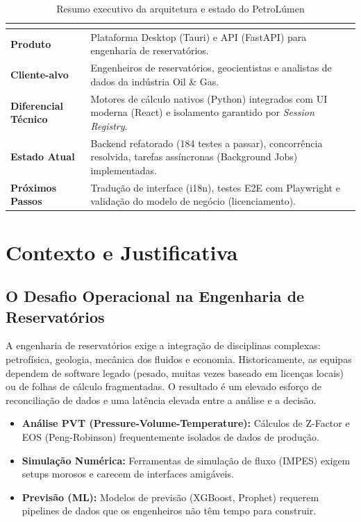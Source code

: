 \documentclass[12pt,a4paper]{article}
\begin{document}
\begin{table}[H]
\centering\small
\begin{tabularx}{\textwidth}{>{\bfseries}p{3.4cm} X}
\toprule
\rowcolor{tableheader}\multicolumn{2}{c}{\textcolor{white}{\textbf{Resumo da Proposta de Valor PetroLúmen}}}\\
\midrule
Produto & Plataforma Desktop (Tauri) e API (FastAPI) para engenharia de reservatórios.\\
Cliente-alvo & Engenheiros de reservatórios, geocientistas e analistas de dados da indústria Oil \& Gas.\\
Diferencial Técnico & Motores de cálculo nativos (Python) integrados com UI moderna (React) e isolamento garantido por \textit{Session Registry}.\\
Estado Atual & Backend refatorado (184 testes a passar), concorrência resolvida, tarefas assíncronas (Background Jobs) implementadas.\\
Próximos Passos & Tradução de interface (i18n), testes E2E com Playwright e validação do modelo de negócio (licenciamento).\\
\bottomrule
\end{tabularx}
\caption{Resumo executivo da arquitetura e estado do PetroLúmen}
\end{table}

\newpage

\section{Contexto e Justificativa}

\subsection{O Desafio Operacional na Engenharia de Reservatórios}

A engenharia de reservatórios exige a integração de disciplinas complexas: petrofísica, geologia, mecânica dos fluidos e economia. Historicamente, as equipas dependem de software legado (pesado, muitas vezes baseado em licenças locais) ou de folhas de cálculo fragmentadas. O resultado é um elevado esforço de reconciliação de dados e uma latência elevada entre a análise e a decisão.

\begin{itemize}[leftmargin=*]
    \item \textbf{Análise PVT (Pressure-Volume-Temperature):} Cálculos de Z-Factor e EOS (Peng-Robinson) frequentemente isolados de dados de produção.
    \item \textbf{Simulação Numérica:} Ferramentas de simulação de fluxo (IMPES) exigem setups morosos e carecem de interfaces amigáveis.
    \item \textbf{Previsão (ML):} Modelos de previsão (XGBoost, Prophet) requerem pipelines de dados que os engenheiros não têm tempo para construir.
\end{itemize}
\end{document}
